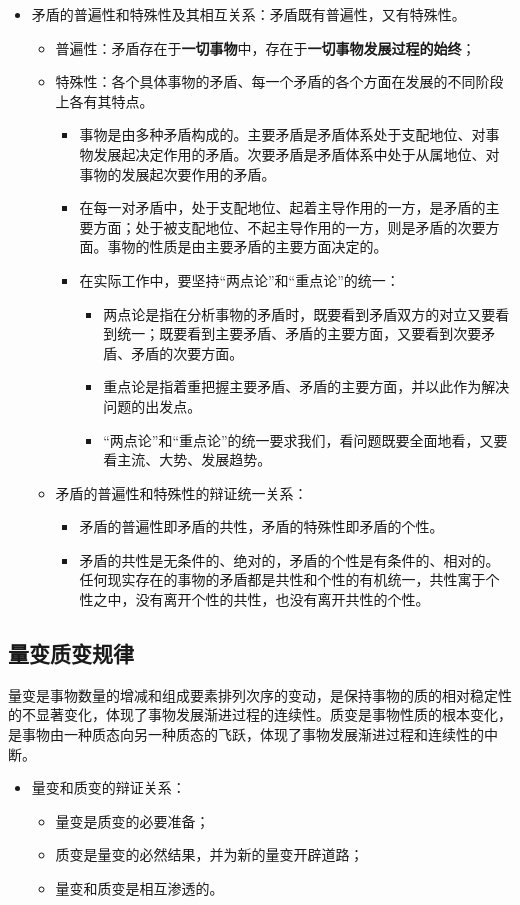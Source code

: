 \documentclass[12pt,openany]{ctexbook}
\begin{document}
\begin{itemize}
\begin{itemize}
\end{itemize}
  \item 矛盾的普遍性和特殊性及其相互关系：矛盾既有普遍性，又有特殊性。
\begin{itemize}
  \item 普遍性：矛盾存在于\textbf{一切事物}中，存在于\textbf{一切事物发展过程的始终}；
  \item 特殊性：各个具体事物的矛盾、每一个矛盾的各个方面在发展的不同阶段上各有其特点。
\begin{itemize}
  \item 事物是由多种矛盾构成的。主要矛盾是矛盾体系处于支配地位、对事物发展起决定作用的矛盾。次要矛盾是矛盾体系中处于从属地位、对事物的发展起次要作用的矛盾。
  \item 在每一对矛盾中，处于支配地位、起着主导作用的一方，是矛盾的主要方面；处于被支配地位、不起主导作用的一方，则是矛盾的次要方面。事物的性质是由主要矛盾的主要方面决定的。
  \item 在实际工作中，要坚持“两点论”和“重点论”的统一：
\begin{itemize}
  \item 两点论是指在分析事物的矛盾时，既要看到矛盾双方的对立又要看到统一；既要看到主要矛盾、矛盾的主要方面，又要看到次要矛盾、矛盾的次要方面。
  \item 重点论是指着重把握主要矛盾、矛盾的主要方面，并以此作为解决问题的出发点。
  \item “两点论”和“重点论”的统一要求我们，看问题既要全面地看，又要看主流、大势、发展趋势。
\end{itemize}
\end{itemize}
  \item 矛盾的普遍性和特殊性的辩证统一关系：
\begin{itemize}
  \item 矛盾的普遍性即矛盾的共性，矛盾的特殊性即矛盾的个性。
  \item 矛盾的共性是无条件的、绝对的，矛盾的个性是有条件的、相对的。任何现实存在的事物的矛盾都是共性和个性的有机统一，共性寓于个性之中，没有离开个性的共性，也没有离开共性的个性。
\end{itemize}
\end{itemize}
\end{itemize}
\subsection{量变质变规律}
量变是事物数量的增减和组成要素排列次序的变动，是保持事物的质的相对稳定性的不显著变化，体现了事物发展渐进过程的连续性。质变是事物性质的根本变化，是事物由一种质态向另一种质态的飞跃，体现了事物发展渐进过程和连续性的中断。
\begin{itemize}
  \item 量变和质变的辩证关系：
\begin{itemize}
  \item 量变是质变的必要准备；
  \item 质变是量变的必然结果，并为新的量变开辟道路；
  \item 量变和质变是相互渗透的。
\end{itemize}
\end{itemize}
\end{document}

